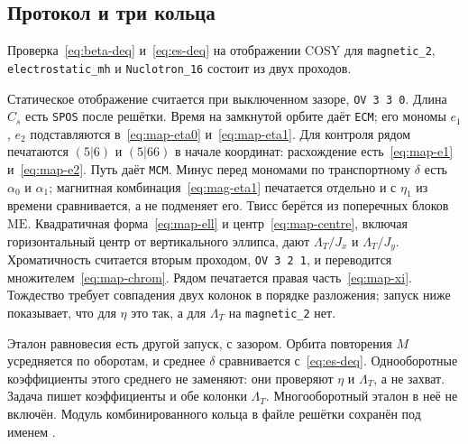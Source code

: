 \documentclass[aps,pra,preprint,a4paper,amsmath,amssymb,longbibliography]{revtex4-2}
\begin{document}
\subsection{Протокол и три кольца}
\label{sec:map-rings}

Проверка~\eqref{eq:beta-deq} и~\eqref{eq:es-deq} на отображении COSY для \texttt{magnetic\_2}, \texttt{electrostatic\_mh} и \texttt{Nuclotron\_16} состоит из двух проходов.

Статическое отображение считается при выключенном зазоре, \texttt{OV 3 3 0}. Длина $C_s$ есть \texttt{SPOS} после решётки. Время на замкнутой орбите даёт \texttt{ECM}; его мономы $e_1$, $e_2$ подставляются в~\eqref{eq:map-eta0} и~\eqref{eq:map-eta1}. Для контроля рядом печатаются $(5|6)$ и $(5|66)$ в начале координат: расхождение есть~\eqref{eq:map-e1} и~\eqref{eq:map-e2}. Путь даёт \texttt{MCM}. Минус перед мономами по транспортному $\delta$ есть $\alpha_0$ и $\alpha_1$; магнитная комбинация~\eqref{eq:mag-eta1} печатается отдельно и с $\eta_1$ из времени сравнивается, а не подменяет его. Твисс берётся из поперечных блоков $\mathrm{ME}$. Квадратичная форма~\eqref{eq:map-ell} и центр~\eqref{eq:map-centre}, включая горизонтальный центр от вертикального эллипса, дают $\Lambda_T/J_x$ и $\Lambda_T/J_y$. Хроматичность считается вторым проходом, \texttt{OV 3 2 1}, и переводится множителем~\eqref{eq:map-chrom}. Рядом печатается правая часть~\eqref{eq:map-xi}. Тождество требует совпадения двух колонок в порядке разложения; запуск ниже показывает, что для $\eta$ это так, а для $\Lambda_T$ на \texttt{magnetic\_2} нет.

Эталон равновесия есть другой запуск, с зазором. Орбита повторения $M$ усредняется по оборотам, и среднее $\delta$ сравнивается с~\eqref{eq:es-deq}. Однооборотные коэффициенты этого среднего не заменяют: они проверяют $\eta$ и $\Lambda_T$, а не захват. Задача  пишет коэффициенты и обе колонки $\Lambda_T$. Многооборотный эталон в неё не включён. Модуль комбинированного кольца в файле решётки сохранён под именем .
\end{document}
